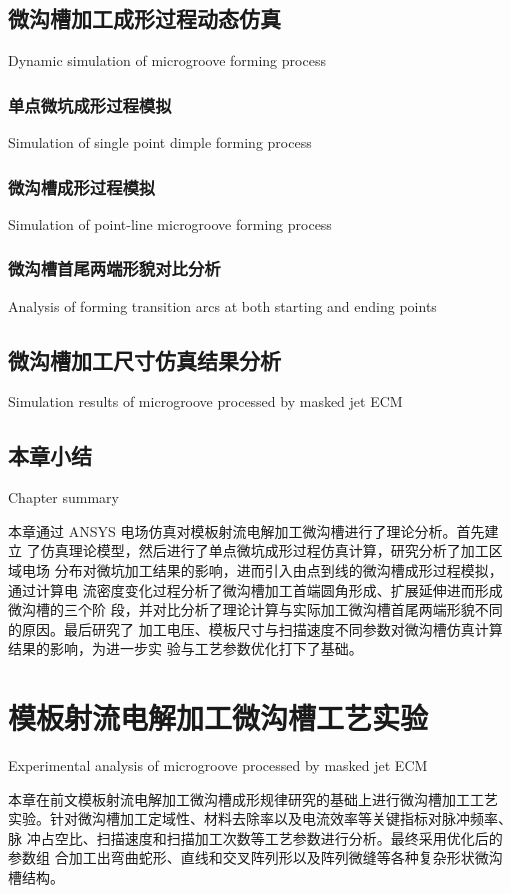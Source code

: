 \documentclass[
  type=doctor
]{../gdutthesis}
\begin{document}
\section{微沟槽加工成形过程动态仿真}{Dynamic simulation of microgroove forming process}

\subsection{单点微坑成形过程模拟}{Simulation of single point dimple forming process}

\subsection{微沟槽成形过程模拟}{Simulation of point-line microgroove forming process}

\subsection{微沟槽首尾两端形貌对比分析}{Analysis of forming transition arcs at both starting and ending points}

\section{微沟槽加工尺寸仿真结果分析}{Simulation results of microgroove processed by masked jet ECM}

\section{本章小结}{Chapter summary}

本章通过 ANSYS 电场仿真对模板射流电解加工微沟槽进行了理论分析。首先建立
了仿真理论模型，然后进行了单点微坑成形过程仿真计算，研究分析了加工区域电场
分布对微坑加工结果的影响，进而引入由点到线的微沟槽成形过程模拟，通过计算电
流密度变化过程分析了微沟槽加工首端圆角形成、扩展延伸进而形成微沟槽的三个阶
段，并对比分析了理论计算与实际加工微沟槽首尾两端形貌不同的原因。最后研究了
加工电压、模板尺寸与扫描速度不同参数对微沟槽仿真计算结果的影响，为进一步实
验与工艺参数优化打下了基础。

\chapter{模板射流电解加工微沟槽工艺实验}{Experimental analysis of microgroove processed by masked jet ECM}

本章在前文模板射流电解加工微沟槽成形规律研究的基础上进行微沟槽加工工艺
实验。针对微沟槽加工定域性、材料去除率以及电流效率等关键指标对脉冲频率、脉
冲占空比、扫描速度和扫描加工次数等工艺参数进行分析。最终采用优化后的参数组
合加工出弯曲蛇形、直线和交叉阵列形以及阵列微缝等各种复杂形状微沟槽结构。
\end{document}
